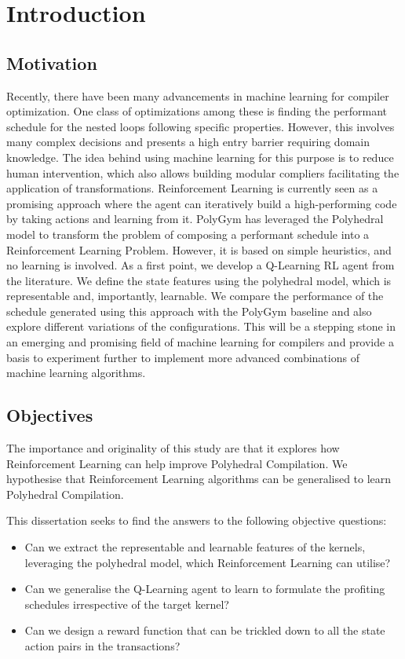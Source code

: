 \documentclass[logo,msc]{infthesis}           %
\begin{document}
\chapter{Introduction}

\section{Motivation}

Recently, there have been many advancements in machine learning for compiler optimization. One class of optimizations among these is finding the performant schedule for the nested loops following specific properties. However, this involves many complex decisions and presents a high entry barrier requiring domain knowledge. The idea behind using machine learning for this purpose is to reduce human intervention, which also allows building modular compliers facilitating the application of transformations. Reinforcement Learning is currently seen as a promising approach where the agent can iteratively build a high-performing code by taking actions and learning from it.\cite{8357388}\cite{9232934} PolyGym has leveraged the Polyhedral model to transform the problem of composing a performant schedule into a Reinforcement Learning Problem. However, it is based on simple heuristics, and no learning is involved. \break
As a first point, we develop a Q-Learning RL agent from the literature. We define the state features using the polyhedral model, which is representable and, importantly, learnable. We compare the performance of the schedule generated using this approach with the PolyGym baseline and also explore different variations of the configurations. This will be a stepping stone in an emerging and promising field of machine learning for compilers and provide a basis to experiment further to implement more advanced combinations of machine learning algorithms.



\section{Objectives}

The importance and originality of this study are that it explores how Reinforcement Learning can help improve Polyhedral Compilation.  We hypothesise that Reinforcement Learning algorithms can be generalised to learn Polyhedral Compilation.

This dissertation seeks to find the answers to the following objective questions:
\begin{itemize}

    \item Can we extract the representable and learnable features of the kernels, leveraging the polyhedral model, which Reinforcement Learning can utilise? 
    \item Can we generalise the Q-Learning agent to learn to formulate the profiting schedules irrespective of the target kernel?
    \item Can we design a reward function that can be trickled down to all the state action pairs in the transactions?

\end{itemize}
\end{document}
